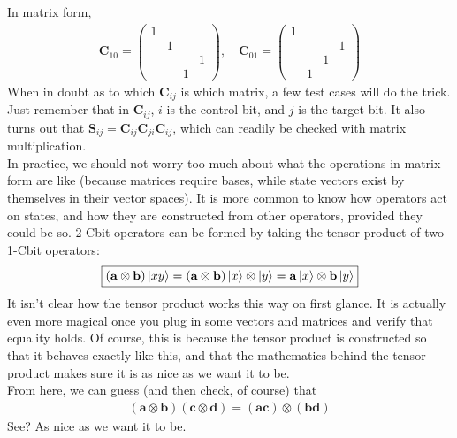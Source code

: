 \documentclass{book}
\theoremstyle{definition}
\begin{document}
In matrix form,
\begin{align}
\boxed{\mathbf{C}_{10} = \begin{pmatrix}
1 &&&\\
&1&&\\
&&&1\\
&&1&
\end{pmatrix}, \quad 
\mathbf{C}_{01} = 
\begin{pmatrix}
1&&&\\
&&&1\\
&&1&\\
&1&&
\end{pmatrix}}
\end{align}
When in doubt as to which $\mathbf{C}_{ij}$ is which matrix, a few test cases will do the trick. Just remember that in $\mathbf{C}_{ij}$, $i$ is the control bit, and $j$ is the target bit. It also turns out that $\mathbf{S}_{ij} = \mathbf{C}_{ij}\mathbf{C}_{ji}\mathbf{C}_{ij}$, which can readily be checked with matrix multiplication. \\

In practice, we should not worry too much about what the operations in matrix form are like (because matrices require bases, while state vectors exist by themselves in their vector spaces). It is more common to know how operators act on states, and how they are constructed from other operators, provided they could be so. 2-Cbit operators can be formed by taking the tensor product of two 1-Cbit operators:
\begin{align}
\boxed{(\mathbf{a}\otimes \mathbf{b})\ket{xy} = (\mathbf{a}\otimes \mathbf{b})\ket{x}\otimes\ket{y} = \mathbf{a}\ket{x}\otimes \mathbf{b}\ket{y}}
\end{align} 
It isn't clear how the tensor product works this way on first glance. It is actually even more magical once you plug in some vectors and matrices and verify that equality holds. Of course, this is because the tensor product is constructed so that it behaves exactly like this, and that the mathematics behind the tensor product makes sure it is as nice as we want it to be. \\

From here, we can guess (and then check, of course) that
\begin{align}
\boxed{(\mathbf{a}\otimes \mathbf{b})(\mathbf{c}\otimes \mathbf{d}) = (\mathbf{ac})\otimes(\mathbf{bd})}
\end{align}
See? As nice as we want it to be.\\
\end{document}
